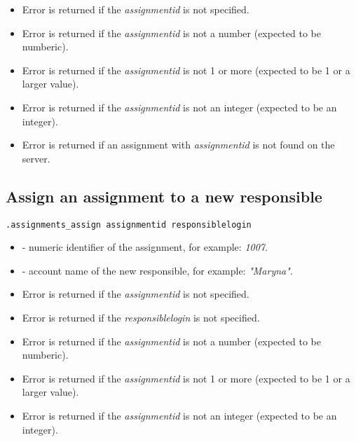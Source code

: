 \errheader
\begin{itemize}
    \item Error  is returned if the \textit{assignmentid} is not specified.
    \item Error  is returned if the \textit{assignmentid} is not a number (expected to be numberic).
    \item Error  is returned if the \textit{assignmentid} is not 1 or more (expected to be 1 or a larger value).
    \item Error  is returned if the \textit{assignmentid} is not an integer (expected to be an integer).
    \item Error  is returned if an assignment with \textit{assignmentid} is not found on the server.
\end{itemize}


\subsection{Assign an assignment to a new responsible}

\begin{lstlisting}[style=CommandLineStyle]
.assignments_assign assignmentid responsiblelogin
\end{lstlisting}

\paramsheader
\begin{itemize}
    \item {} - numeric identifier of the assignment, for example: \textit{1007}.
    \item {} - account name of the new responsible, for example: \textit{"Maryna"}.
\end{itemize}

\errheader
\begin{itemize}
    \item Error  is returned if the \textit{assignmentid} is not specified.
    \item Error  is returned if the \textit{responsiblelogin} is not specified.
    \item Error  is returned if the \textit{assignmentid} is not a number (expected to be numberic).
    \item Error  is returned if the \textit{assignmentid} is not 1 or more (expected to be 1 or a larger value).
    \item Error  is returned if the \textit{assignmentid} is not an integer (expected to be an integer).
\end{itemize}



